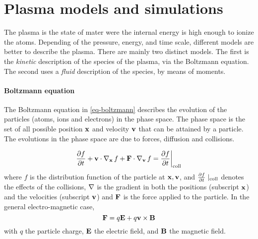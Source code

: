 

\section*{Plasma models and simulations}
\label{sec-simulations}

The plasma is the state of mater were the internal energy is high enough to ionize the atoms.
Depending of the pressure, energy, and time scale, different models are better to describe the plasma.
There are mainly two distinct models.
The first is the \emph{kinetic} description of the species of the plasma, via the Boltzmann equation.
The second uses a \emph{fluid} description of the species, by means of moments.
% 


\paragraph{Boltzmann equation \\}
The Boltzmann equation in \cref{eq-boltzmann} describes the evolution of the particles (atoms, ions and electrons) in the phase space.
The phase space is the set of all possible position ${\mathbf x}$ and velocity ${\mathbf v}$ that can be attained by a particle.
The evolutions in the phase space are due to forces, diffusion and collisions.

\begin{equation} \label{eq-boltzmann}
\frac{\partial f}{\partial t}  + {\mathbf v} \cdot \operatorname{{\mathbf \nabla}}_{{\mathbf x}} f + {\mathbf F} \cdot  \operatorname{{\mathbf \nabla}}_{{\mathbf v}} f = \frac{\partial f}{\partial t}  \bigg\vert_{\rm coll} 
\end{equation}
where $f$ is the distribution function of the particle at ${\mathbf x}, {\mathbf v}$, and $\frac{\partial f}{\partial t}\mid_{\rm coll}$ denotes the effects of the collisions, $\operatorname{{\mathbf \nabla}}$ is the gradient in both the positions (subscript ${\mathbf x}$) and the velocities (subscript ${\mathbf v}$)  and ${\mathbf F}$ is the force applied to the particle.
In the general electro-magnetic case,
\begin{equation*} \label{eq-forceEM}
  {\mathbf F} =  q {\mathbf E} + q {\mathbf v} \times {\mathbf B}
\end{equation*}
with $q$ the particle charge, ${\mathbf E}$ the electric field, and ${\mathbf B}$ the magnetic field.

